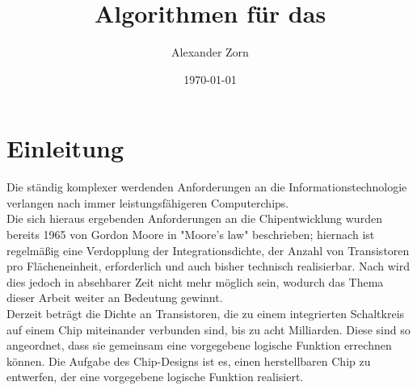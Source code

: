 \documentclass[11pt, a4paper, german]{article}
\author{Alexander Zorn}
\date{\today}
\title{Algorithmen f\"ur das \TM}
\begin{document}
\setlength{\parindent}{0pt} %
\renewcommand{\proofname}{Beweis:}
\maketitle

\tableofcontents
\newpage 
\section{Einleitung}
\label{sec:einleitung}
Die ständig komplexer werdenden Anforderungen an die Informationstechnologie verlangen nach immer leistungsfähigeren Computerchips. \\
Die sich hieraus ergebenden Anforderungen an die Chipentwicklung wurden bereits 1965 von Gordon Moore in "Moore's law"  \cite{Moore} beschrieben; hiernach ist regelmäßig eine Verdopplung der Integrationsdichte, der Anzahl von Transistoren pro Flächeneinheit, erforderlich und auch bisher technisch realisierbar. Nach \cite{Khan} wird dies jedoch in absehbarer Zeit nicht mehr möglich sein, wodurch das Thema dieser Arbeit weiter an Bedeutung gewinnt. \\
Derzeit beträgt die Dichte an Transistoren, die zu einem integrierten Schaltkreis auf einem Chip miteinander verbunden sind, bis zu acht Milliarden. Diese sind so angeordnet, dass sie gemeinsam eine vorgegebene logische Funktion errechnen können. Die Aufgabe des Chip-Designs ist es, einen herstellbaren Chip zu entwerfen, der eine vorgegebene logische Funktion realisiert.\\
\end{document}
